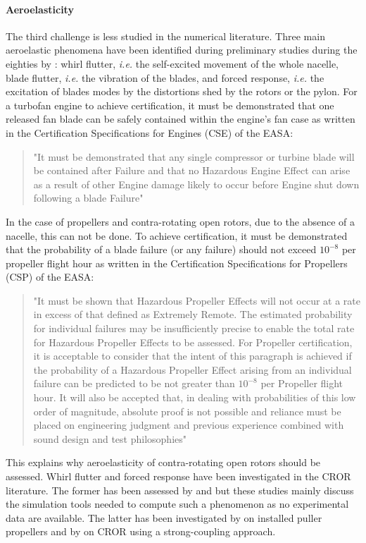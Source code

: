 \paragraph{Aeroelasticity}
The third challenge is less studied in the numerical literature.
Three main aeroelastic phenomena have been identified during preliminary studies
during the eighties by \citet{Hager1988}: whirl flutter, \emph{i.e.} the self-excited
movement of the whole nacelle, blade flutter, \emph{i.e.} the vibration
of the blades, and forced response, \emph{i.e.} the excitation of blades modes
by the distortions shed by the rotors or the pylon.
For a turbofan engine to achieve certification, it must be 
demonstrated that one released fan blade can be safely contained 
within the engine’s fan case as written in the 
Certification Specifications for Engines (CSE) of the EASA:
\begin{quote}
	"It must be demonstrated that any single compressor or turbine blade will be contained after Failure and 
that no Hazardous Engine Effect can arise as a result of other Engine damage likely to occur before 
Engine shut down following a blade Failure"
\end{quote}
In the case of propellers and contra-rotating open rotors, due to the absence of a nacelle,
this can not be done. To achieve certification, it must be demonstrated that the probability of a blade
failure (or any failure) should not exceed $10^{-8}$ per propeller flight hour as written in 
the Certification Specifications for Propellers (CSP) of the EASA:
\begin{quote}
	"It must be shown that Hazardous Propeller Effects will not occur at a rate in excess of that defined 
as Extremely Remote. The estimated probability for individual failures may be insufficiently precise 
to enable the total rate for Hazardous Propeller Effects to be assessed. For Propeller certification, it 
is acceptable to consider that the intent of this paragraph is achieved if the probability of a 
Hazardous Propeller Effect arising from an individual failure can be predicted to be not greater than 
$10^{-8}$ per Propeller flight hour. It will also be accepted that, in dealing with probabilities of this low 
order of magnitude, absolute proof is not possible and reliance must be placed on engineering 
judgment and previous experience combined with sound design and test philosophies" 
\end{quote}
This explains why aeroelasticity of contra-rotating open rotors should be assessed.
Whirl flutter and forced response have been investigated
in the CROR literature. The former has been assessed by \citet{CISicot2011a} and 
\citet{Verley2013} but these studies mainly
discuss the simulation tools needed to compute such a phenomenon as
no experimental data are available.
The latter has been investigated by \citet{Ruiz-Calavera2012}
on installed puller propellers and by \citet{Laban2010} on
CROR using a strong-coupling approach. 
